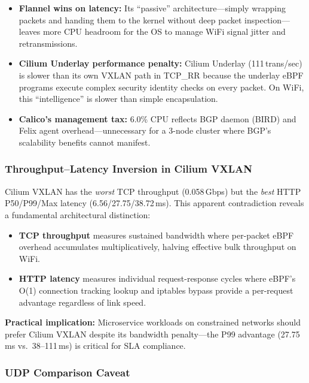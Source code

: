 \documentclass[11pt,a4paper]{article}
\begin{document}
\begin{itemize}
  \item \textbf{Flannel wins on latency:} Its ``passive'' architecture---simply wrapping packets and handing them to the kernel without deep packet inspection---leaves more CPU headroom for the OS to manage WiFi signal jitter and retransmissions.
  \item \textbf{Cilium Underlay performance penalty:} Cilium Underlay (111\,trans/sec) is slower than its own VXLAN path in TCP\_RR because the underlay eBPF programs execute complex security identity checks on every packet. On WiFi, this ``intelligence'' is slower than simple encapsulation.
  \item \textbf{Calico's management tax:} 6.0\% CPU reflects BGP daemon (BIRD) and Felix agent overhead---unnecessary for a 3-node cluster where BGP's scalability benefits cannot manifest.
\end{itemize}

\subsubsection{Throughput--Latency Inversion in Cilium VXLAN}

Cilium VXLAN has the \emph{worst} TCP throughput (0.058\,Gbps) but the \emph{best} HTTP P50/P99/Max latency (6.56/27.75/38.72\,ms). This apparent contradiction reveals a fundamental architectural distinction:

\begin{itemize}
  \item \textbf{TCP throughput} measures sustained bandwidth where per-packet eBPF overhead accumulates multiplicatively, halving effective bulk throughput on WiFi.
  \item \textbf{HTTP latency} measures individual request-response cycles where eBPF's O(1) connection tracking lookup and iptables bypass provide a per-request advantage regardless of link speed.
\end{itemize}

\noindent\textbf{Practical implication:} Microservice workloads on constrained networks should prefer Cilium VXLAN despite its bandwidth penalty---the P99 advantage (27.75\,ms vs.\ 38--111\,ms) is critical for SLA compliance.

\subsubsection{UDP Comparison Caveat}
\end{document}
